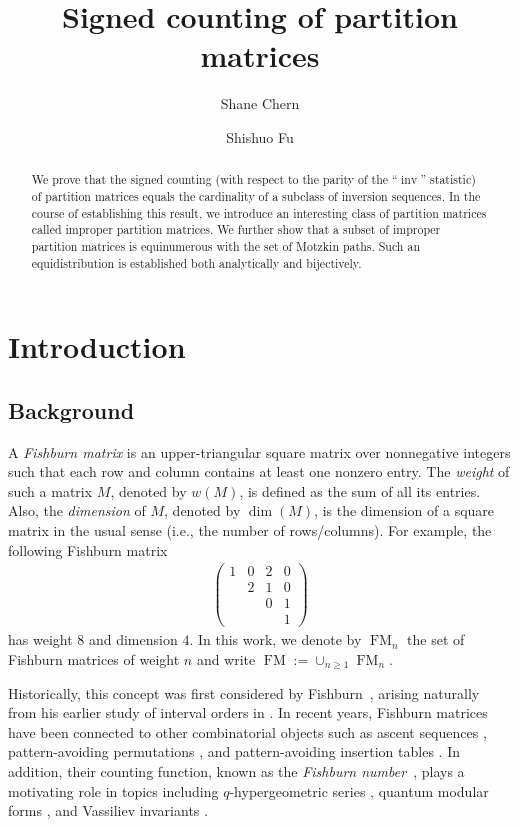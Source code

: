 \documentclass[12pt,reqno]{amsart}
\title{Signed counting of partition matrices}
\author[S. Chern]{Shane Chern}
\author[S. Fu]{Shishuo Fu}
\date{}
\numberwithin{equation}{section}
\theoremstyle{theorem}
\theoremstyle{definition}
\theoremstyle{named}
\newcommand{\OEIS}[1]{\href{https://oeis.org/#1}{#1}}
\newcommand{\MatF}{\operatorname{FM}}
\begin{document}
	
\sloppy

\begin{abstract}
	We prove that the signed counting (with respect to the parity of the ``$\operatorname{inv}$'' statistic) of partition matrices equals the cardinality of a subclass of inversion sequences. In the course of establishing this result, we introduce an interesting class of partition matrices called improper partition matrices. We further show that a subset of improper partition matrices is equinumerous with the set of Motzkin paths. Such an equidistribution is established both analytically and bijectively.
\end{abstract}

\maketitle

\section{Introduction}

\subsection{Background}\label{sec:background}

A \emph{Fishburn matrix} is an upper-triangular square matrix over nonnegative integers such that each row and column contains at least one nonzero entry. The \emph{weight} of such a matrix $M$, denoted by $w(M)$, is defined as the sum of all its entries. Also, the \emph{dimension} of $M$, denoted by $\dim(M)$, is the dimension of a square matrix in the usual sense (i.e., the number of rows/columns). For example, the following Fishburn matrix
\begin{align}\label{eq:F-Max-ex}
	\begin{pmatrix}
		1 & 0 & 2 & 0\\
		& 2 & 1 & 0\\
		&   & 0 & 1\\
		&   &   & 1
	\end{pmatrix}
\end{align}
has weight $8$ and dimension $4$. In this work, we denote by $\MatF_{n}$ the set of Fishburn matrices of weight $n$ and write $\MatF:= \cup_{n\ge 1} \MatF_n$.

Historically, this concept was first considered by Fishburn~\cite{Fis1983,Fis1985}, arising naturally from his earlier study of interval orders in \cite{Fis1970}. In recent years, Fishburn matrices have been connected to other combinatorial objects such as ascent sequences \cite{BCDK2010}, pattern-avoiding permutations \cite{BCDK2010,CYZ2019}, and pattern-avoiding insertion tables \cite{Lev2013}. In addition, their counting function, known as the \emph{Fishburn number}~\cite[\OEIS{A022493}]{OEIS}, plays a motivating role in topics including $q$-hypergeometric series \cite{AJ2014}, quantum modular forms \cite{Zag2010}, and Vassiliev invariants \cite{Sto1998,Zag2001}.
\end{document}
